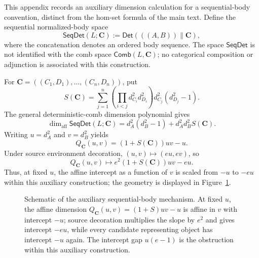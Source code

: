 \documentclass[11pt,a4paper]{article}
\theoremstyle{definition}
\theoremstyle{plain}
\theoremstyle{remark}
\newcommand{\Det}{\mathsf{Det}}
\newcommand{\Comb}{\mathsf{Comb}}
\newcommand{\affdim}{\dim_{\mathrm{aff}}}
\newcommand{\concat}{\mathbin{\|}}
\begin{document}
This appendix records an auxiliary dimension calculation for a sequential-body convention, distinct from the hom-set formula of the main text. Define the sequential normalized-body space
\[
\mathsf{SeqDet}(L;\mathbf C):=\Det(((A,B))\concat\mathbf C),
\]
where the concatenation denotes an ordered body sequence. The space
$\mathsf{SeqDet}$ is not identified with the comb space
$\Comb(L,\mathbf C)$; no categorical composition or adjunction is
associated with this construction.

For $\mathbf C=((C_1,D_1),\ldots,(C_n,D_n))$, put
\[
S(\mathbf C)=\sum_{j=1}^n
\left(\prod_{i<j}d_{C_i}^2d_{D_i}^2\right)d_{C_j}^2(d_{D_j}^2-1).
\]
The general deterministic-comb dimension polynomial gives
\[
\affdim\mathsf{SeqDet}(L;\mathbf C)
=d_A^2(d_B^2-1)+d_A^2d_B^2S(\mathbf C).
\]
Writing $u=d_A^2$ and $v=d_B^2$ yields
\[
Q_{\mathbf C}(u,v)=(1+S(\mathbf C))uv-u.
\]
Under source environment decoration, $(u,v)\mapsto(eu,ev)$, so
\[
Q_{\mathbf C}(u,v)\mapsto e^2(1+S(\mathbf C))uv-eu.
\]
Thus, at fixed $u$, the affine intercept as a function of $v$ is scaled from $-u$ to $-eu$ within this auxiliary construction; the geometry is displayed in Figure~\ref{fig:intercept}.

\begin{figure}[ht]
\centering
{}
\caption{Schematic of the auxiliary sequential-body mechanism. At fixed $u$, the affine dimension $Q_{\mathbf C}(u,v)=(1+S)uv-u$ is affine in $v$ with intercept $-u$; source decoration multiplies the slope by $e^2$ and gives intercept $-eu$, while every candidate representing object has intercept $-u$ again. The intercept gap $u(e-1)$ is the obstruction within this auxiliary construction.}
\label{fig:intercept}
\end{figure}
\end{document}
